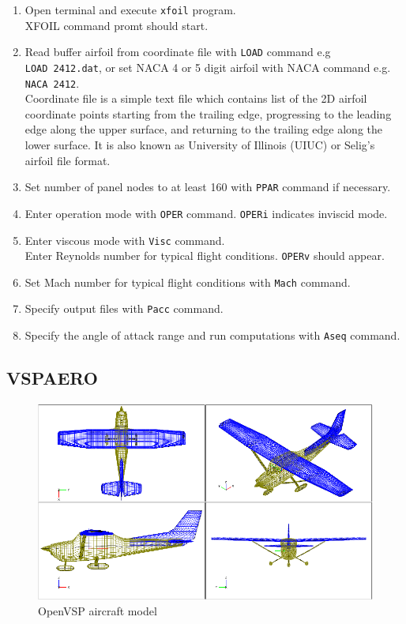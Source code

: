\begin{enumerate}
  \item Open terminal and execute \texttt{xfoil} program. \\
  XFOIL command promt should start.
  \item Read buffer airfoil from coordinate file with \texttt{LOAD} command e.g \texttt{LOAD~2412.dat}, or set NACA 4 or 5 digit airfoil with NACA command e.g. \texttt{NACA~2412}. \\
  Coordinate file is a simple text file which contains list of the 2D airfoil coordinate points starting from the trailing edge, progressing to the leading edge along the upper surface, and returning to the trailing edge along the lower surface. It is also known as University of Illinois (UIUC) or Selig's airfoil file format.
  \item Set number of panel nodes to at least 160 with \texttt{PPAR} command if necessary.
  \item Enter operation mode with \texttt{OPER} command. \texttt{OPERi} indicates inviscid mode.
  \item Enter viscous mode with \texttt{Visc} command. \\
  Enter Reynolds number for typical flight conditions. \texttt{OPERv} should appear.
  \item Set Mach number for typical flight conditions with \texttt{Mach} command.
  \item Specify output files with \texttt{Pacc} command.
  \item Specify the angle of attack range and run computations with \texttt{Aseq} command.
\end{enumerate}

\subsection{VSPAERO}

\begin{figure}
  \centering
  \includegraphics[width=120mm]{eps/vspaero_01.eps}
  \caption{OpenVSP aircraft model}
\end{figure}

